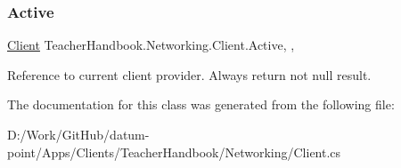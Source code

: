 \subsubsection{\texorpdfstring{Active}{Active}}
{\footnotesize\ttfamily \mbox{\hyperlink{class_teacher_handbook_1_1_networking_1_1_client}{Client}} Teacher\+Handbook.\+Networking.\+Client.\+Active\hspace{0.3cm}{\ttfamily [static]}, {\ttfamily [get]}, {}}



Reference to current client provider. Always return not null result. 



The documentation for this class was generated from the following file\+:\begin{DoxyCompactItemize}
\item 
D\+:/\+Work/\+Git\+Hub/datum-\/point/\+Apps/\+Clients/\+Teacher\+Handbook/\+Networking/Client.\+cs\end{DoxyCompactItemize}
